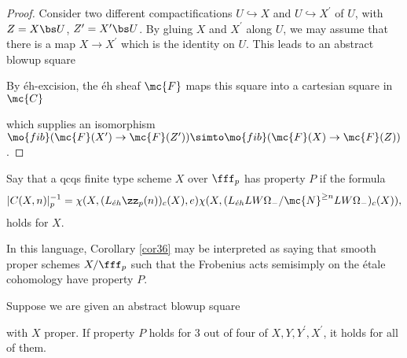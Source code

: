 \begin{proof}
Consider two different compactifications $U\hookrightarrow X$ and $U\hookrightarrow X^{\prime}$ of $U$, with $Z=X\bs U$, $Z^{\prime}=X^{\prime}\bs U$.  By gluing $X$ and $X^{\prime}$ along $U$, we may assume that there is a map $X\to X^{\prime}$ which is the identity on $U$.  This leads to an abstract blowup square
\begin{center}
\end{center}
 By \'{e}h-excision, the \'{e}h sheaf $\mc{F}$ maps this square into a cartesian square in $\mc{C}$
 \begin{center}
 \end{center}
which supplies an isomorphism $\mo{fib}(\mc{F}(X^{\prime})\to\mc{F}(Z^{\prime}))\simto \mo{fib}(\mc{F}(X)\to\mc{F}(Z))$.
\end{proof}
\begin{definition}
Say that a qcqs finite type scheme $X$ over $\fff_p$ has property $P$ if the formula $$|C(X,n)|_{p}^{-1}=\chi(X,(L_{\acute{e}h}\zz_p(n))_{c}(X),e)\chi(X,(L_{\acute{e}h}LW\Omega_{-}/\mc{N}^{\geq n}LW\Omega_{-})_c(X)),$$ holds for $X$.
\end{definition}
In this language, Corollary \ref{cor36} may be interpreted as saying that smooth proper schemes $X/\fff_p$ such that the Frobenius acts semisimply on the \'{e}tale cohomology have property $P$.
\begin{proposition}\label{prop310}
Suppose we are given an abstract blowup square 
\begin{center}
\end{center}
with $X$ proper.  If property $P$ holds for 3 out of four of $X,Y,Y^{\prime},X^{\prime}$, it holds for all of them.
\end{proposition}
